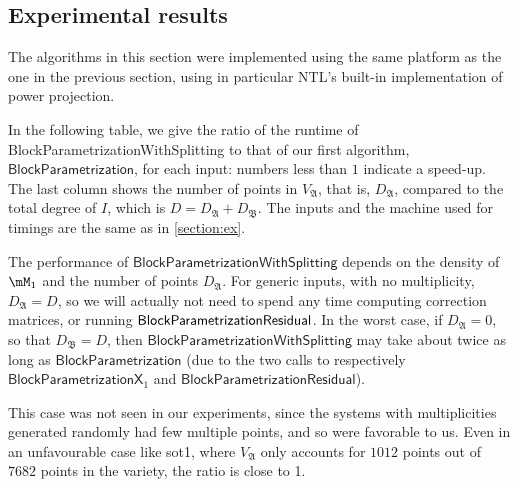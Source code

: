 \documentclass[12pt]{article}
\newcommand{\mainalgoname}{\mathsf{ BlockParametrization}}
\begin{document}

\subsection{Experimental results}

The algorithms in this section were implemented using the same
platform as the one in the previous section, using in particular NTL's
built-in implementation of power projection.

In the following table, we give the ratio of the runtime of {\sf
  Block\-Parametrization\-WithSplitting} to that of our first
algorithm, $\mainalgoname$, for each input: numbers less than $1$
indicate a speed-up.  The last column shows the number of points in
$V_\mathfrak{A}$, that is, $D_\mathfrak{A}$, compared to the total
degree of $I$, which is $D=D_\mathfrak{A}+D_\mathfrak{B}$. The inputs
and the machine used for timings are the same as in \cref{section:ex}.

The performance of $\mathsf{BlockParametrizationWithSplitting}$ depends on
the density of $\mM_1$ and the number of points $D_\mathfrak{A}$.  For
generic inputs, with no multiplicity, $D_\mathfrak{A}=D$, so we will
actually not need to spend any time computing correction matrices, or running 
$\mainalgoname{\sf Residual}$. In the worst
case, if $D_\mathfrak{A}=0$, so that $D_\mathfrak{B}=D$, then
$\mathsf{BlockParametrizationWithSplitting}$ may take about twice as long
as $\mainalgoname$ (due to the two calls to respectively
$\mathsf{BlockParametrizationX}_1$ and
$\mathsf{BlockParametrizationResidual}$).

This case was not seen in our experiments, since the systems with
multiplicities generated randomly had few multiple points, and so were
favorable to us. Even in an unfavourable case like sot1, where
$V_\mathfrak{A}$ only accounts for $1012$ points out of $7682$ points
in the variety, the ratio is close to 1.
\end{document}
